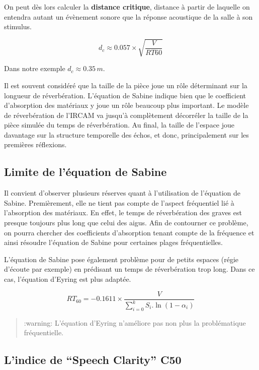 \documentclass[
  letterpaper,
  DIV=11,
  numbers=noendperiod]{scrreprt}
\begin{document}
On peut dès lors calculer la \textbf{distance critique}, distance à
partir de laquelle on entendra autant un évènement sonore que la réponse
acoustique de la salle à son stimulus.

\[d_c \approx 0.057 \times \sqrt{\frac{V}{RT60}}\]

Dans notre exemple \(d_c \approx 0.35\,m\).

Il est souvent considéré que la taille de la pièce joue un rôle
déterminant sur la longueur de réverbération. L'équation de Sabine
indique bien que le coefficient d'absorption des matériaux y joue un
rôle beaucoup plus important. Le modèle de réverbération de l'IRCAM va
jusqu'à complètement décorréler la taille de la pièce simulée du temps
de réverbération. Au final, la taille de l'espace joue davantage sur la
structure temporelle des échos, et donc, principalement sur les
premières réflexions.

\hypertarget{limite-de-luxe9quation-de-sabine}{%
\subsection{Limite de l'équation de
Sabine}\label{limite-de-luxe9quation-de-sabine}}

Il convient d'observer plusieurs réserves quant à l'utilisation de
l'équation de Sabine. Premièrement, elle ne tient pas compte de l'aspect
fréquentiel lié à l'absorption des matériaux. En effet, le temps de
réverbération des graves est presque toujours plus long que celui des
aigus. Afin de contourner ce problème, on pourra chercher des
coefficients d'absorption tenant compte de la fréquence et ainsi
résoudre l'équation de Sabine pour certaines plages fréquentielles.

L'équation de Sabine pose également problème pour de petits espaces
(régie d'écoute par exemple) en prédisant un temps de réverbération trop
long. Dans ce cas, l'équation d'Eyring est plus adaptée.

\[RT_{60} = -0.1611 \times \frac{V}{\sum_{i=0}^{k} S_i.\ln(1-\alpha_i)}\]

\begin{quote}
:warning: L'équation d'Eyring n'améliore pas non plus la problématique
fréquentielle.
\end{quote}

\hypertarget{lindice-de-speech-clarity-c50}{%
\subsection{L'indice de ``Speech Clarity''
C50}\label{lindice-de-speech-clarity-c50}}
\end{document}
